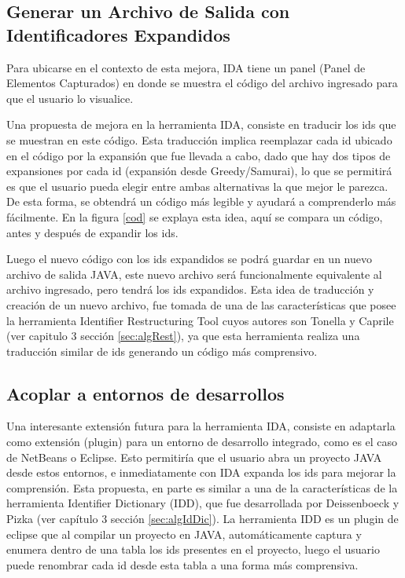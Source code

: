 \subsection{Generar un Archivo de Salida con Identificadores Expandidos}

Para ubicarse en el contexto de esta mejora, IDA tiene un panel (Panel de Elementos Capturados) en donde se muestra el código del archivo ingresado para que el usuario lo visualice. 


Una propuesta de mejora en la herramienta IDA, consiste en traducir los ids que se muestran en este código.
Esta traducción implica reemplazar cada id ubicado en el código por la expansión que fue llevada a cabo, dado que hay dos tipos de expansiones por cada id (expansión desde Greedy/Samurai), lo que se permitirá es que el usuario pueda elegir entre ambas alternativas la que mejor le parezca. De esta forma, se obtendrá un código más legible y ayudará a comprenderlo más fácilmente. En la figura \ref{cod} se explaya esta idea, aquí se compara un código, antes y después de expandir los ids.

Luego el nuevo código con los ids expandidos se podrá guardar en un nuevo archivo de salida JAVA, este nuevo archivo será funcionalmente equivalente al archivo ingresado, pero tendrá los ids expandidos. Esta idea de traducción y creación de un nuevo archivo, fue tomada de una de las características que posee la herramienta Identifier Restructuring Tool cuyos autores son Tonella y Caprile (ver capitulo 3 sección \ref{sec:algRest}), ya que esta herramienta realiza una traducción similar de ids generando un código más comprensivo.

\subsection{Acoplar a entornos de desarrollos}

Una interesante extensión futura para la herramienta IDA, consiste en adaptarla como extensión (plugin) para un entorno de desarrollo integrado, como es el caso de NetBeans o Eclipse. Esto permitiría que el usuario abra un proyecto JAVA desde estos entornos, e inmediatamente con IDA expanda los ids para mejorar la comprensión. Esta propuesta, en parte es similar a una de la características de la herramienta Identifier Dictionary (IDD), que fue desarrollada por Deissenboeck y Pizka (ver capítulo 3 sección \ref{sec:algIdDic}). La herramienta IDD es un plugin de eclipse que al compilar un proyecto en JAVA, automáticamente captura y enumera dentro de una tabla los ids presentes en el proyecto, luego el usuario puede renombrar cada id desde esta tabla a una forma más comprensiva.


